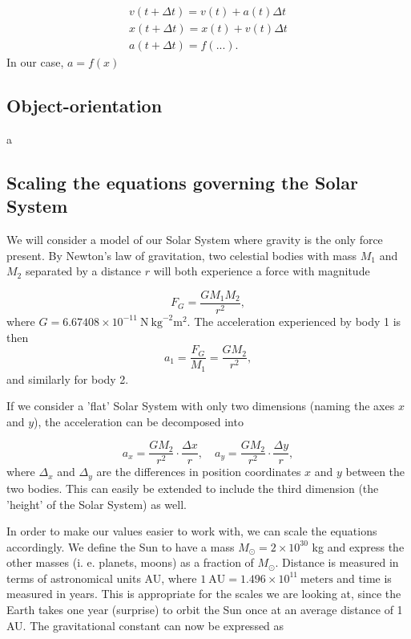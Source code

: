 \documentclass{emulateapj}
\begin{document}
\begin{gather}
    v(t + \Delta t) = v(t) + a(t) \Delta t \\
    x(t + \Delta t) = x(t) + v(t) \Delta t \\
    a(t + \Delta t) = f( ... ).
\end{gather}
In our case, $a = f(x)$


\subsection{Object-orientation}
a

\subsection{Scaling the equations governing the Solar System}
We will consider a model of our Solar System where gravity is the only force present. By Newton's law of gravitation, two celestial bodies with mass $M_1$ and $M_2$ separated by a distance $r$ will both experience a force with magnitude

\begin{equation}\label{eq:gforce}
    F_G = \frac{G M_1 M_2}{r^2},
\end{equation}
where $G = 6.67408 \times 10^{-11} \ \textrm{N} \ \textrm{kg}^{-2} \textrm{m}^2$. The acceleration experienced by body 1 is then
\begin{equation}
    a_1 = \frac{F_G}{M_1} = \frac{G M_2}{r^2},
\end{equation}
and similarly for body 2.

If we consider a 'flat' Solar System with only two dimensions (naming the axes $x$ and $y$), the acceleration can be decomposed into

\begin{equation}
    a_x = \frac{G M_2}{r^2}\cdot\frac{\Delta x}{r}, \quad a_y = \frac{G M_2}{r^2}\cdot\frac{\Delta y}{r},
\end{equation}
where $\Delta_x$ and $\Delta_y$ are the differences in position coordinates $x$ and $y$ between the two bodies. This can easily be extended to include the third dimension (the 'height' of the Solar System) as well. 

In order to make our values easier to work with, we can scale the equations accordingly. We define the Sun to have a mass $M_\odot = 2\times 10^{30}$ kg and express the other masses (i. e. planets, moons) as a fraction of $M_\odot$. Distance is measured in terms of astronomical units AU, where $1 \ \textrm{AU} = 1.496 \times 10^{11} \ \textrm{meters}$ and time is measured in years. This is appropriate for the scales we are looking at, since the Earth takes one year (surprise) to orbit the Sun once at an average distance of 1 AU. The gravitational constant can now be expressed as 
\end{document}
